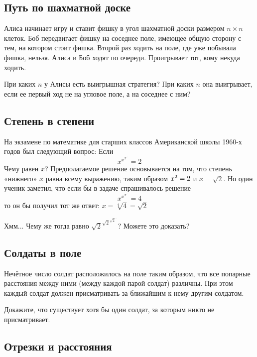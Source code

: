 \subsection*{Путь по шахматной доске} %

Алиса начинает игру и ставит фишку в угол шахматной доски размером $n{\times}n$ клеток.
Боб передвигает фишку на соседнее поле, имеющее общую сторону с тем, на котором стоит фишка.
Второй раз ходить на поле, где уже побывала фишка, нельзя. 
Алиса и Боб ходят по очереди.
Проигрывает тот, кому некуда ходить.

При каких $n$ у Алисы есть выигрышная стратегия? 
При каких $n$ она выигрывает, если ее первый ход не на угловое поле, а на соседнее с ним?

\subsection*{Степень в степени} %

На экзамене по математике для старших классов Американской школы 1960-х годов 
был следующий вопрос:
Если 
$$x^{x^{x^{{\cdot}^{\cdot^{\cdot}}}}}=2$$
Чему равен $x$? 
Предполагаемое решение основывается на том, что степень «нижнего» $x$ равна всему выражению, таким образом $x^2\z=2$ и $x=\sqrt{2}$.
Но один ученик заметил, что если бы в задаче спрашивалось решение
$$x^{x^{x^{{\cdot}^{\cdot^{\cdot}}}}}=4$$
то он бы получил тот же ответ: $x=\sqrt[4]{4}=\sqrt{2}$

Хмм...
Чему же тогда равно ${\sqrt{2}}^{{\sqrt{2}}^{{\sqrt{2}}^{{\cdot}^{\cdot^{\cdot}}}}}$? 
Можете это доказать?

\subsection*{Солдаты в поле} %

Нечётное число солдат расположилось на поле таким образом, что все попарные расстояния между ними (между каждой парой солдат) различны.
При этом каждый солдат должен присматривать за ближайшим к нему другим солдатом.

Докажите, что существует хотя бы один солдат, за которым никто не присматривает.

\subsection*{Отрезки и расстояния} %

